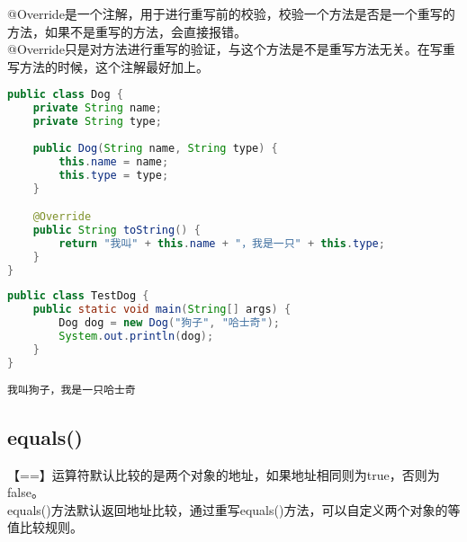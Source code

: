 @Override是一个注解，用于进行重写前的校验，校验一个方法是否是一个重写的方法，如果不是重写的方法，会直接报错。\\

@Override只是对方法进行重写的验证，与这个方法是不是重写方法无关。在写重写方法的时候，这个注解最好加上。\\


\begin{lstlisting}[language=Java, title=Dog.java]
public class Dog {
    private String name;
    private String type;
    
    public Dog(String name, String type) {
        this.name = name;
        this.type = type;
    }

    @Override
    public String toString() {
        return "我叫" + this.name + "，我是一只" + this.type;
    }
}
\end{lstlisting}

\begin{lstlisting}[language=Java, title=TestDog.java]
public class TestDog {
    public static void main(String[] args) {
        Dog dog = new Dog("狗子", "哈士奇");
        System.out.println(dog);
    }
}
\end{lstlisting}

\begin{tcolorbox}
	\begin{verbatim}
我叫狗子，我是一只哈士奇
	\end{verbatim}
\end{tcolorbox}

\vspace{0.5cm}

\subsection{equals()}

【==】运算符默认比较的是两个对象的地址，如果地址相同则为true，否则为false。\\

equals()方法默认返回地址比较，通过重写equals()方法，可以自定义两个对象的等值比较规则。\\


